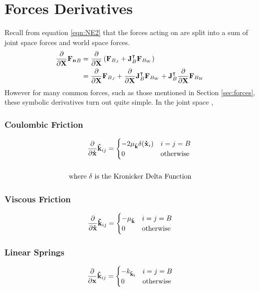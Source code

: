 \section{Forces Derivatives}
\noindent Recall from equation \ref{eqn:NE2} that the forces acting on are split into a sum of joint space forces and world space forces.
\begin{align*}
    \frac{\partial}{\partial\mathbf{X}}{\mathbf{F_n}}_B & =\frac{\partial}{\partial\mathbf{X}}\left ({\mathbf{F}}_{B_J} + \mathbf{J}_B^\intercal {\mathbf{F}}_{B_W} \right ) \\
    &= \frac{\partial}{\partial\mathbf{X}}{\mathbf{F}}_{B_J} + \frac{\partial}{\partial\mathbf{X}}\mathbf{J}_B^\intercal {\mathbf{F}}_{B_W} + \mathbf{J}_B^\intercal \frac{\partial}{\partial\mathbf{X}}{\mathbf{F}}_{B_W}
\end{align*}
\noindent However for many common forces, such as those mentioned in Section \ref{sec:forces}, these symbolic derivatives turn out quite simple. In the joint space , 
\subsubsection{Coulombic Friction}
\begin{align} \label{eqn:coulomb}
    \frac{\partial}{\partial{\mathbf{\dot{x}}}}\mathbf{\hat{k}}_{ij} = 
    \begin{cases}
         - 2\mu_{\mathbf{\hat{k}}}\delta({\mathbf{\dot{x}}}_i) & i = j = B \\
         0 & \text{otherwise}
    \end{cases} \\ \nonumber \\ \nonumber
    \text{where $\delta$ is the Kronicker Delta Function}
\end{align}
\subsubsection{Viscous Friction}
\begin{align} \label{eqn:coulomb}
    \frac{\partial}{\partial{\mathbf{\dot{x}}}}\mathbf{\hat{k}}_{ij} = 
    \begin{cases}
         - \mu_{\mathbf{\hat{k}}} & i = j = B \\
         0 & \text{otherwise}
    \end{cases}
\end{align}
\subsubsection{Linear Springs}
\begin{align} \label{eqn:spring}
    \frac{\partial}{\partial{\mathbf{{x}}}}\mathbf{\hat{k}}_{ij} = 
    \begin{cases}
         - k_{\mathbf{\hat{k}_i}} & i = j = B \\
         0 & \text{otherwise}
    \end{cases}
\end{align}

